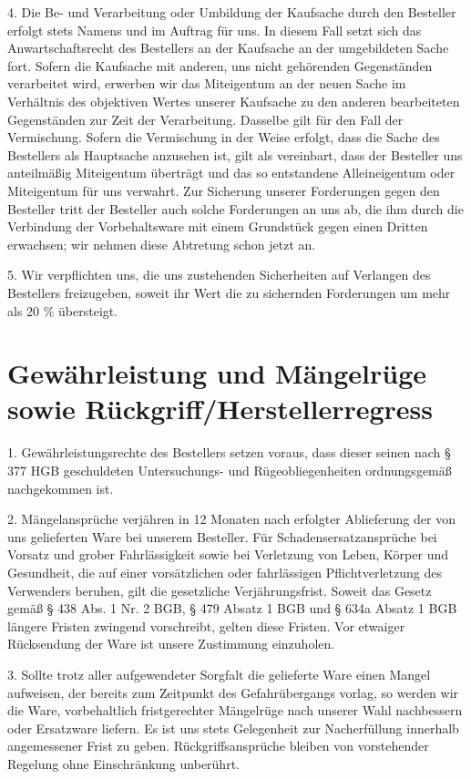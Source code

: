 \documentclass[a4paper, final, 11pt, oneside]{scrartcl}
\begin{document}
\begin{multicols}{2}
4. Die Be- und Verarbeitung oder Umbildung der Kaufsache durch den Besteller erfolgt stets Namens und im Auftrag für uns. In diesem Fall setzt sich das Anwartschaftsrecht des Bestellers an der Kaufsache an der umgebildeten Sache fort. Sofern die Kaufsache mit anderen, uns nicht gehörenden Gegenständen verarbeitet wird, erwerben wir das Miteigentum an der neuen Sache im Verhältnis des objektiven Wertes unserer Kaufsache zu den anderen bearbeiteten Gegenständen zur Zeit der Verarbeitung. Dasselbe gilt für den Fall der Vermischung. Sofern die Vermischung in der Weise erfolgt, dass die Sache des Bestellers als Hauptsache anzusehen ist, gilt als vereinbart, dass der Besteller uns anteilmäßig Miteigentum überträgt und das so entstandene Alleineigentum oder Miteigentum für uns verwahrt. Zur Sicherung unserer Forderungen gegen den Besteller tritt der Besteller auch solche Forderungen an uns ab, die ihm durch die Verbindung der Vorbehaltsware mit einem Grundstück gegen einen Dritten erwachsen; wir nehmen diese Abtretung schon jetzt an.

5. Wir verpflichten uns, die uns zustehenden Sicherheiten auf Verlangen des Bestellers freizugeben, soweit ihr Wert die zu sichernden Forderungen um mehr als 20 \% übersteigt.

\section{Gewährleistung und Mängelrüge sowie Rückgriff/Herstellerregress}
1. Gewährleistungsrechte des Bestellers setzen voraus, dass dieser seinen nach § 377 HGB geschuldeten Untersuchungs- und Rügeobliegenheiten ordnungsgemäß nachgekommen ist.

2. Mängelansprüche verjähren in 12 Monaten nach erfolgter Ablieferung der von uns gelieferten Ware bei unserem Besteller. Für Schadensersatzansprüche bei Vorsatz und grober Fahrlässigkeit sowie bei Verletzung von Leben, Körper und Gesundheit, die auf einer vorsätzlichen oder fahrlässigen Pflichtverletzung des Verwenders beruhen, gilt die gesetzliche Verjährungsfrist. Soweit das Gesetz gemäß § 438 Abs. 1 Nr. 2 BGB, § 479 Absatz 1 BGB und § 634a Absatz 1 BGB längere Fristen zwingend vorschreibt, gelten diese Fristen. Vor etwaiger Rücksendung der Ware ist unsere Zustimmung einzuholen.

3. Sollte trotz aller aufgewendeter Sorgfalt die gelieferte Ware einen Mangel aufweisen, der bereits zum Zeitpunkt des Gefahrübergangs vorlag, so werden wir die Ware, vorbehaltlich fristgerechter Mängelrüge nach unserer Wahl nachbessern oder Ersatzware liefern. Es ist uns stets Gelegenheit zur Nacherfüllung innerhalb angemessener Frist zu geben. Rückgriffsansprüche bleiben von vorstehender Regelung ohne Einschränkung unberührt.


\end{multicols}
\end{document}

